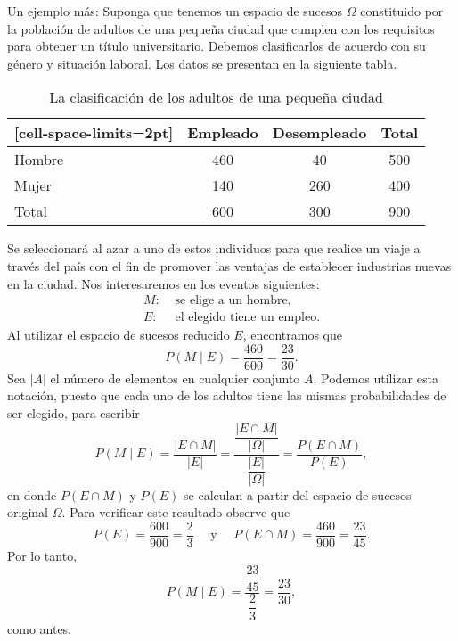 Un ejemplo más: Suponga que tenemos un espacio de sucesos $\Omega$ constituido por la población de adultos de una pequeña ciudad que cumplen con los requisitos para obtener un título universitario. Debemos clasificarlos de acuerdo con su género y situación laboral. Los datos se presentan en la siguiente tabla.
\begin{table}[h!]
    \centering
    \begin{NiceTabular}{lccc}[cell-space-limits=2pt]
        \toprule
        & \textbf{Empleado} & \textbf{Desempleado} & \textbf{Total} \\
        \midrule
        Hombre & 460 & \phantom{2}40 & 500 \\
        Mujer & 140 & 260 & 400 \\
        Total & 600 & 300 & 900 \\
        \bottomrule
    \end{NiceTabular}
    \caption{La clasificación de los adultos de una pequeña ciudad}
\end{table}

Se seleccionará al azar a uno de estos individuos para que realice un viaje a través del país con el fin de promover las ventajas de establecer industrias nuevas en la ciudad. Nos interesaremos en los eventos siguientes:
\begin{align*}
    M: & \text{ se elige a un hombre,} \\
    E: & \text{ el elegido tiene un empleo}.
\end{align*}
Al utilizar el espacio de sucesos reducido $E$, encontramos que
$$P(M \mid E) = \frac{460}{600} = \frac{23}{30}.$$\newpage\noindent
Sea $|A|$ el número de elementos en cualquier conjunto $A$. Podemos utilizar esta notación, puesto que cada uno de los adultos tiene las mismas probabilidades de ser elegido, para escribir
$$P(M \mid E) = \frac{|E \cap M|}{|E|} = \frac{\dfrac{|E \cap M|}{|\Omega|}}{\dfrac{|E|}{|\Omega|}} = \frac{P(E \cap M)}{P(E)},$$
en donde $P(E \cap M)$ y $P(E)$ se calculan a partir del espacio de sucesos original $\Omega$. Para verificar este resultado observe que
$$P(E) = \frac{600}{900} = \frac{2}{3} \quad \text{ y } \quad P(E \cap M) = \frac{460}{900} = \frac{23}{45}.$$
Por lo tanto,
$$P(M \mid E) = \frac{\dfrac{23}{45}}{\dfrac{2}{3}} = \frac{23}{30},$$
como antes.

